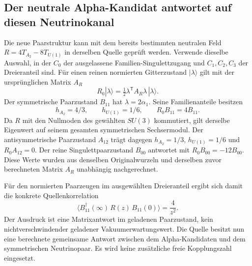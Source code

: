 \subsection{Der neutrale Alpha-Kandidat antwortet auf diesen Neutrinokanal}\label{sec:neutralpairward}
Die neue Paarstruktur kann mit dem bereits bestimmten neutralen Feld $R=4T_{A_2}-8T_{U(1)}$ in derselben Quelle geprüft werden. Verwende dieselbe Auswahl, in der $C_0$ der ausgelassene Familien-Singulettzugang und $C_1,C_2,C_3$ der Dreieranteil sind. Für einen reinen normierten Gitterzustand $|\lambda\rangle$ gilt mit der ursprünglichen Matrix $A_R$
\begin{equation}
R_0|\lambda\rangle=\tfrac12\lambda^{\mathsf T}A_R\lambda\,|\lambda\rangle.
\end{equation}
Der symmetrische Paarzustand $B_{11}$ hat $\lambda=2\alpha_1$. Seine Familienanteile besitzen
\begin{equation}
h_{A_2}=4/3,\qquad h_{U(1)}=1/6,\qquad
\boxed{R_0 B_{11}=4B_{11}.}
\end{equation}
Da $R$ mit den Nullmoden des gewählten $SU(3)$ kommutiert, gilt derselbe Eigenwert auf seinem gesamten symmetrischen Sechsermodul. Der antisymmetrische Paarzustand $A_{12}$ trägt dagegen $h_{A_2}=1/3$, $h_{U(1)}=1/6$ und $R_0A_{12}=0$. Der reine Singulettpaarzustand $B_{00}$ antwortet mit $R_0B_{00}=-12B_{00}$. Diese Werte wurden aus denselben Originalwurzeln und derselben zuvor berechneten Matrix $A_R$ unabhängig nachgerechnet.

Für den normierten Paarzeugen im ausgewählten Dreieranteil ergibt sich damit die konkrete Quellenkorrelation
\begin{equation}\label{eq:neutralmajoranaward}
\boxed{\langle B_{11}^{\dagger}(\infty)\,R(z)\,B_{11}(0)\rangle
=\frac{4}{z^2}.}
\end{equation}
Der Ausdruck ist eine Matrixantwort im geladenen Paarzustand, kein nichtverschwindender geladener Vakuumerwartungswert. Die Quelle besitzt nun eine berechnete gemeinsame Antwort zwischen dem Alpha-Kandidaten und dem symmetrischen Neutrinopaar. Es wird keine zusätzliche freie Kopplungszahl eingesetzt.


